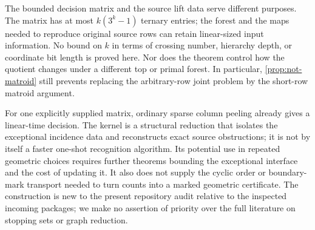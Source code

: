 The bounded decision matrix and the source lift data serve different
purposes. The matrix has at most $k(3^k-1)$ ternary entries; the forest and
the maps needed to reproduce original source rows can retain linear-sized
input information. No bound on $k$ in terms of crossing number, hierarchy
depth, or coordinate bit length is proved here. Nor does the theorem
control how the quotient changes under a different top or primal forest.
In particular, \cref{prop:not-matroid} still prevents replacing the
arbitrary-row joint problem by the short-row matroid argument.

For one explicitly supplied matrix, ordinary sparse column peeling
already gives a linear-time decision. The kernel is a structural reduction
that isolates the exceptional incidence data and reconstructs exact source
obstructions; it is not by itself a faster one-shot recognition algorithm.
Its potential use in repeated geometric choices requires further theorems
bounding the exceptional interface and the cost of updating it. It also
does not supply the cyclic order or boundary-mark transport needed to turn
counts into a marked geometric certificate. The construction is new to
the present repository audit relative to the inspected incoming packages;
we make no assertion of priority over the full literature on stopping
sets or graph reduction.
